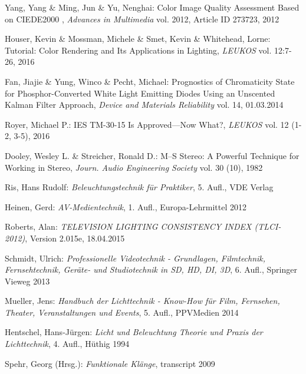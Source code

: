 \begin{thebibliography}{}
Yang, Yang \& Ming, Jun \& Yu, Nenghai:
\glqq Color Image Quality Assessment Based on CIEDE2000 \grqq,
\emph{Advances in Multimedia} vol. 2012, Article ID 273723, 2012

Houser, Kevin \& Mossman, Michele \& Smet, Kevin \& Whitehead, Lorne:
\glqq Tutorial: Color Rendering and Its Applications in
Lighting\grqq, 
\emph{LEUKOS} vol. 12:7-26, 2016

Fan, Jiajie \& Yung, Winco \& Pecht, Michael:
\glqq Prognostics of Chromaticity State for Phosphor-Converted White Light Emitting Diodes Using an Unscented Kalman Filter Approach\grqq, 
\emph{Device and Materials Reliability} vol. 14, 01.03.2014

Royer, Michael P.:
\glqq IES TM-30-15 Is Approved—Now What?\grqq, 
\emph{LEUKOS} vol. 12 (1-2, 3-5), 2016


Dooley, Wesley L.  \& Streicher, Ronald D.:
\glqq M--S Stereo: A Powerful Technique for Working in Stereo\grqq, 
\emph{Journ. Audio Engineering Society} vol. 30 (10), 1982

Ris, Hans Rudolf: 
\emph{Beleuchtungstechnik für Praktiker}, 5. Aufl., VDE Verlag

Heinen, Gerd: 
\emph{AV-Medientechnik}, 1. Aufl., Europa-Lehrmittel 2012

Roberts, Alan: 
\emph{TELEVISION LIGHTING CONSISTENCY INDEX (TLCI-2012)}, Version 2.015e, 18.04.2015

Schmidt, Ulrich: 
\emph{Professionelle Videotechnik - Grundlagen, Filmtechnik, Fernsehtechnik, Geräte- und Studiotechnik in SD, HD, DI, 3D}, 6. Aufl., Springer Vieweg 2013

Mueller, Jens: 
\emph{Handbuch der Lichttechnik - Know-How für Film, Fernsehen, Theater, Veranstaltungen und Events}, 5. Aufl., PPVMedien 2014
 
Hentschel, Hans-Jürgen: 
\emph{Licht und Beleuchtung Theorie und Praxis der Lichttechnik}, 4. Aufl., Hüthig 1994

Spehr, Georg (Hrsg.): 
\emph{Funktionale Klänge}, transcript 2009


\end{thebibliography}
